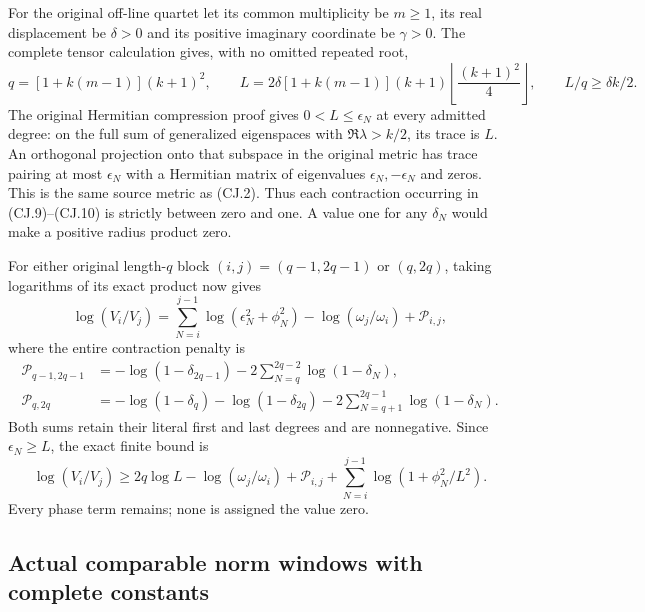 \documentclass[11pt,a4paper]{article}
\begin{document}
For the original off-line quartet let its common multiplicity
be $m\ge1$, its real displacement be $\delta>0$ and its
positive imaginary coordinate be $\gamma>0$. The complete
tensor calculation gives, with no omitted repeated root,
\[
 q=[1+k(m-1)](k+1)^2,\qquad
 L=2\delta[1+k(m-1)](k+1)
              \left\lfloor\frac{(k+1)^2}{4}\right\rfloor,
 \qquad L/q\ge\delta k/2.
 \tag{CJ.11}
\]
The original Hermitian compression proof gives
$0<L\le\epsilon_N$ at every admitted degree: on the full
sum of generalized eigenspaces with $\Re\lambda>k/2$, its
trace is $L$. An orthogonal projection onto that subspace in
the original metric has trace pairing at most $\epsilon_N$
with a Hermitian matrix of eigenvalues $\epsilon_N,-\epsilon_N$
and zeros. This is the same source metric as (CJ.2).
Thus each contraction occurring in (CJ.9)--(CJ.10) is strictly
between zero and one. A value one for any $\delta_N$ would
make a positive radius product zero.

For either original length-$q$ block $(i,j)=(q-1,2q-1)$ or
$(q,2q)$, taking logarithms of its exact product now gives
\[
 \log(V_i/V_j)
 =\sum_{N=i}^{j-1}\log(\epsilon_N^2+\phi_N^2)
       -\log(\omega_j/\omega_i)+\mathcal P_{i,j},
 \tag{CJ.12}
\]
where the entire contraction penalty is
\[
 \begin{split}
 \mathcal P_{q-1,2q-1}
 &=-\log(1-\delta_{2q-1})
       -2\sum_{N=q}^{2q-2}\log(1-\delta_N),\\
 \mathcal P_{q,2q}
 &=-\log(1-\delta_q)-\log(1-\delta_{2q})
       -2\sum_{N=q+1}^{2q-1}\log(1-\delta_N).
 \end{split}
 \tag{CJ.13}
\]
Both sums retain their literal first and last degrees and are
nonnegative. Since $\epsilon_N\ge L$, the exact finite bound is
\[
 \log(V_i/V_j)\ge2q\log L-\log(\omega_j/\omega_i)
   +\mathcal P_{i,j}
   +\sum_{N=i}^{j-1}\log(1+\phi_N^2/L^2).
 \tag{CJ.14}
\]
Every phase term remains; none is assigned the value zero.

\subsection{Actual comparable norm windows with complete constants}
\end{document}
